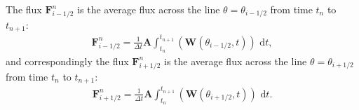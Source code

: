The flux $\mathbf{F}_{i-1/2}^n$ is the average flux across the line $\theta = \theta_{i-1/2}$ from time $t_n$ to $t_{n+1}$:
\begin{align*}
    \mathbf{F}_{i-1/2}^n = \frac{1}{\Delta t} \mathbf{A} \int_{t_n}^{t_{n+1}} (\mathbf{W}(\theta_{i-1/2}, t)) \text{ d}t,
\end{align*}
and correspondingly the flux $\mathbf{F}_{i+1/2}^n$ is the average flux across the line $\theta = \theta_{i+1/2}$ from time $t_n$ to $t_{n+1}$:
\begin{align*}
    \mathbf{F}_{i+1/2}^n = \frac{1}{\Delta t} \mathbf{A} \int_{t_n}^{t_{n+1}} (\mathbf{W}(\theta_{i+1/2}, t)) \text{ d}t.
\end{align*}

